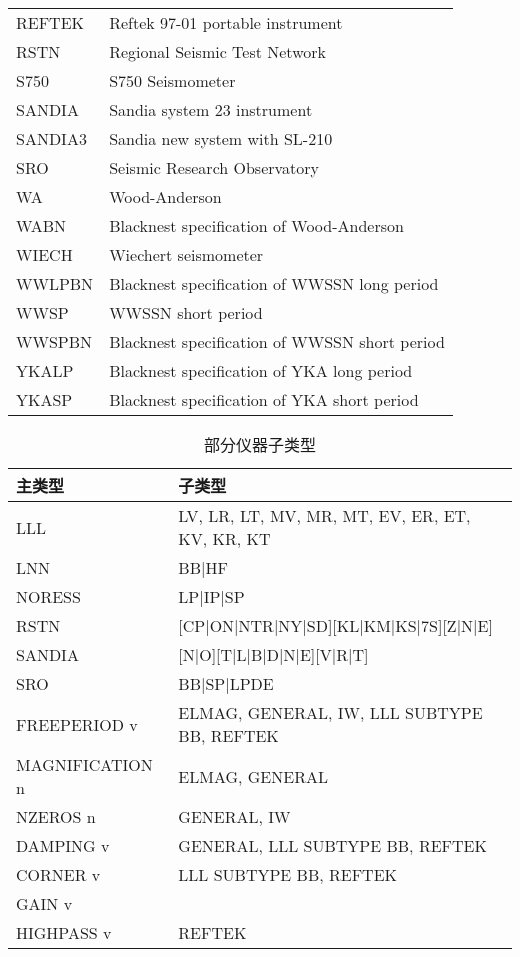 \begin{table}[tp]
\begin{tabular}{ll}
REFTEK   &  Reftek 97-01 portable instrument    \\
RSTN     &  Regional Seismic Test Network   \\
S750     &  S750 Seismometer    \\
SANDIA   &  Sandia system 23 instrument \\
SANDIA3  &  Sandia new system with SL-210   \\
SRO      &  Seismic Research Observatory    \\
WA       &  Wood-Anderson   \\
WABN     &  Blacknest specification of Wood-Anderson    \\
WIECH    &  Wiechert seismometer    \\
WWLPBN   &  Blacknest specification of WWSSN long period    \\
WWSP     &  WWSSN short period  \\
WWSPBN   &  Blacknest specification of WWSSN short period   \\
YKALP    &  Blacknest specification of YKA long period  \\
YKASP    &  Blacknest specification of YKA short period \\
\bottomrule
\end{tabular}
\end{table}

\begin{table}[htb]
\centering
\ttfamily
\small
\caption{部分仪器子类型}
\label{table:instrument-subtype}
\begin{tabular}{ll}
\toprule
主类型 &   子类型 \\
\midrule
LLL       &       LV, LR, LT, MV, MR, MT, EV, ER, ET, KV, KR, KT    \\
LNN       &       BB|HF                                 \\
NORESS    &       LP|IP|SP                              \\
RSTN      &       [CP|ON|NTR|NY|SD][KL|KM|KS|7S][Z|N|E] \\
SANDIA    &       [N|O][T|L|B|D|N|E][V|R|T]             \\
SRO       &       BB|SP|LPDE                            \\
FREEPERIOD v &    ELMAG, GENERAL, IW, LLL SUBTYPE BB, REFTEK    \\
MAGNIFICATION n & ELMAG, GENERAL  \\
NZEROS n &        GENERAL, IW   \\
DAMPING v &       GENERAL, LLL SUBTYPE BB, REFTEK   \\
CORNER v &        LLL SUBTYPE BB, REFTEK    \\
GAIN v &            \\
HIGHPASS v &      REFTEK    \\
\bottomrule
\end{tabular}
\end{table}

